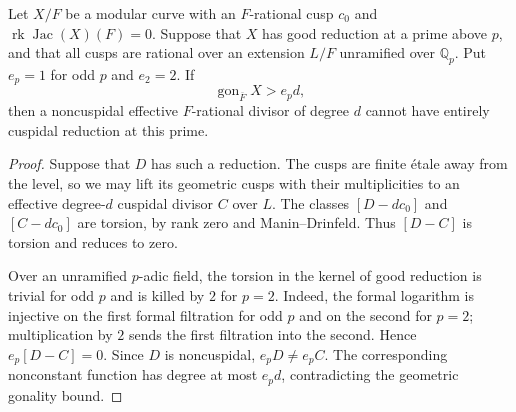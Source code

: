 \begin{lemma}\label{lem:octic-unramified-cuspidal}
Let $X/F$ be a modular curve with an $F$-rational cusp $c_0$ and
$\operatorname{rk}\operatorname{Jac}(X)(F)=0$. Suppose that $X$
has good reduction at a prime above $p$, and that all cusps are
rational over an extension $L/F$ unramified over $\mathbb Q_p$.
Put $e_p=1$ for odd $p$ and $e_2=2$. If
\[
 \operatorname{gon}_{\overline F}X>e_p d,
\]
then a noncuspidal effective $F$-rational divisor of degree $d$
cannot have entirely cuspidal reduction at this prime.
\end{lemma}
\begin{proof}
Suppose that $D$ has such a reduction. The cusps are finite
\'{e}tale away from the level, so we may lift its geometric
cusps with their multiplicities to an effective degree-$d$
cuspidal divisor $C$ over $L$. The classes $[D-dc_0]$ and
$[C-dc_0]$ are torsion, by rank zero and Manin--Drinfeld.
Thus $[D-C]$ is torsion and reduces to zero.

Over an unramified $p$-adic field, the torsion in the kernel of
good reduction is trivial for odd $p$ and is killed by $2$ for
$p=2$. Indeed, the formal logarithm is injective on the first
formal filtration for odd $p$ and on the second for $p=2$;
multiplication by $2$ sends the first filtration into the second.
Hence $e_p[D-C]=0$. Since $D$ is noncuspidal, $e_pD\ne e_pC$.
The corresponding nonconstant function has degree at most
$e_p d$, contradicting the geometric gonality bound.
\end{proof}

